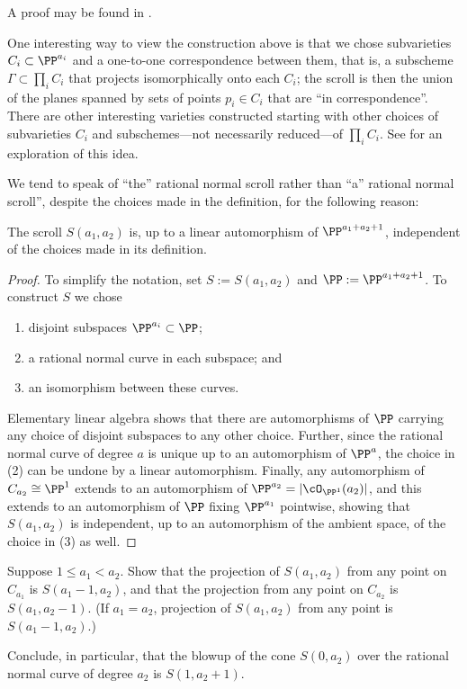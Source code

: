 A proof may be found in \cite{Eisenbud-Harris-Centennial}.

One interesting way to view the construction above is that we chose subvarieties $C_{i}\subset \PP^{a_{i}}$ and a one-to-one correspondence between them, that is, a subscheme
$\Gamma\subset \prod_{i}C_{i}$ that projects isomorphically onto each $C_{i}$; the scroll is then the
union of the planes spanned by sets of points $p_{i}\in C_{i}$ that are ``in correspondence''. There are other interesting varieties constructed starting with other choices of subvarieties $C_{i}$ and subschemes---not necessarily reduced---of $\prod_{i}C_{i}$. See \cite{Eisenbud-Sammartano} for an exploration of this idea.

We tend to speak of ``the'' rational normal scroll rather than ``a'' rational normal scroll'', despite the choices made in the definition, for the following reason:

\begin{proposition}\label{uniqueness of scrolls}
The scroll $S(a_1,a_2)$ is, up to a linear automorphism of $\PP^{a_1+a_2+1}$, independent of the choices made in its
 definition. 
\end{proposition}
\begin{proof} 
To simplify the notation, set $S := S(a_{1}, a_{2})$ and $\PP := \PP^{a_1+a_2+1}$.
To construct $S$ we chose 
\begin{enumerate}
 \item disjoint subspaces $\PP^{a_i}\subset \PP$;
 \item a rational normal curve in each subspace; and
 \item an isomorphism between these curves.
\end{enumerate}
Elementary linear algebra shows that there are automorphisms of $\PP$ carrying any choice of disjoint subspaces to any other choice. Further, since the rational normal curve of degree $a$ is unique up to an automorphism of $\PP^{a}$, the choice in (2) can be undone by a linear automorphism. Finally, any automorphism of $C_{a_{2}}\cong \PP^{1}$ extends to an automorphism of $\PP^{a_{2}} = |\cO_{\PP^{1}}(a_{2})|$, and this extends to an automorphism of $\PP$ fixing $\PP^{a_{1}}$ pointwise,
showing that $S(a_{1}, a_{2})$ is independent, up to an automorphism of the ambient space, of the choice in (3)  as well.
\end{proof}

\begin{exercise}\label{special projections}
Suppose $1\leq a_1 < a_2$. Show that the projection of $S(a_1,a_2)$ from any point on $C_{a_1}$ is 
$S(a_1-1, a_2)$, and that the projection from any point on $C_{a_2}$ is $S(a_1, a_2-1)$. (If $a_1 = a_2$, projection of $S(a_1,a_2)$ from any point is $S(a_1-1, a_2)$.)

Conclude, in particular, that the blowup of the cone $S(0,a_2)$ over the rational normal curve of degree $a_2$ is $S(1,a_2+1)$.  
\end{exercise}



